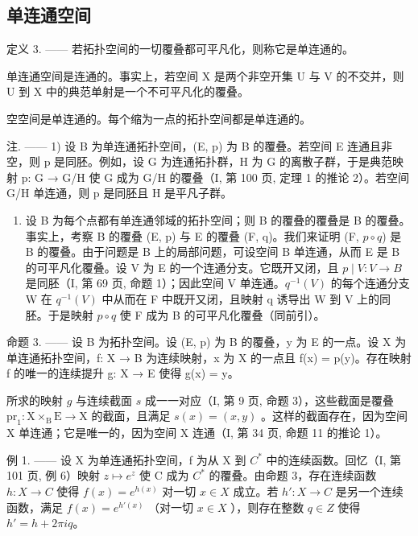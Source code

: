 \subsection{单连通空间}

定义 3. —— 若拓扑空间的一切覆叠都可平凡化，则称它是单连通的。

单连通空间是连通的。事实上，若空间 X 是两个非空开集 U 与 V 的不交并，则 U 到 X 中的典范单射是一个不可平凡化的覆叠。

空空间是单连通的。每个缩为一点的拓扑空间都是单连通的。

注. —— 1) 设 B 为单连通拓扑空间，(E, p) 为 B 的覆叠。若空间 E 连通且非空，则 p 是同胚。例如，设 G 为连通拓扑群，H 为 G 的离散子群，于是典范映射 p: G → G/H 使 G 成为 G/H 的覆叠（I, 第 100 页, 定理 1 的推论 2）。若空间 G/H 单连通，则 p 是同胚且 H 是平凡子群。

\begin{enumerate}
\def\labelenumi{\arabic{enumi})}
\setcounter{enumi}{1}
\tightlist
\item
  设 B 为每个点都有单连通邻域的拓扑空间；则 B 的覆叠的覆叠是 B 的覆叠。事实上，考察 B 的覆叠 (E, p) 与 E 的覆叠 (F, q)。我们来证明 (F, \(p \circ q\)) 是 B 的覆叠。由于问题是 B 上的局部问题，可设空间 B 单连通，从而 E 是 B 的可平凡化覆叠。设 V 为 E 的一个连通分支。它既开又闭，且 \(p \mid V: V \to B\) 是同胚（I, 第 69 页, 命题 1）；因此空间 V 单连通。\(q^{-1}(V)\) 的每个连通分支 W 在 \(q^{-1}(V)\) 中从而在 F 中既开又闭，且映射 q 诱导出 W 到 V 上的同胚。于是映射 \(p \circ q\) 使 F 成为 B 的可平凡化覆叠（同前引）。
\end{enumerate}

命题 3. —— 设 B 为拓扑空间。设 (E, p) 为 B 的覆叠，y 为 E 的一点。设 X 为单连通拓扑空间，f: X → B 为连续映射，x 为 X 的一点且 f(x) = p(y)。存在映射 f 的唯一的连续提升 g: X → E 使得 g(x) = y。

所求的映射 \(g\) 与连续截面 \(s\) 成一一对应（I, 第 9 页, 命题 3），这些截面是覆叠 \(\mathrm{pr}_1: \mathrm{X} \times_{\mathrm{B}} \mathrm{E} \to \mathrm{X}\) 的截面，且满足 \(s(x) = (x, y)\) 。这样的截面存在，因为空间 X 单连通；它是唯一的，因为空间 X 连通（I, 第 34 页, 命题 11 的推论 1）。

例 1. —— 设 X 为单连通拓扑空间，f 为从 X 到 \(C^{*}\) 中的连续函数。回忆（I, 第 101 页, 例 6）映射 \(z \mapsto e^{z}\) 使 C 成为 \(C^{*}\) 的覆叠。由命题 3，存在连续函数 \(h: X \to C\) 使得 \(f(x) = e^{h(x)}\) 对一切 \(x \in X\) 成立。若 \(h': X \to C\) 是另一个连续函数，满足 \(f(x) = e^{h'(x)}\) （对一切 \(x \in X\) ），则存在整数 \(q \in Z\) 使得 \(h' = h + 2\pi iq\)。

